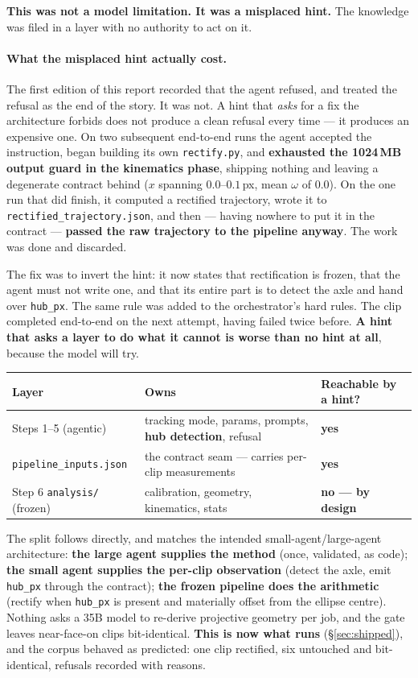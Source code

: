 \documentclass[11pt,a4paper]{article}
\begin{document}
\textbf{This was not a model limitation. It was a misplaced hint.} The knowledge was filed in a
layer with no authority to act on it.

\paragraph{What the misplaced hint actually cost.} The first edition of this report recorded that
the agent refused, and treated the refusal as the end of the story. It was not. A hint that
\emph{asks} for a fix the architecture forbids does not produce a clean refusal every time --- it
produces an expensive one. On two subsequent end-to-end runs the agent accepted the instruction,
began building its own \texttt{rectify.py}, and \textbf{exhausted the 1024\,MB output guard in the
kinematics phase}, shipping nothing and leaving a degenerate contract behind ($x$ spanning
$0.0$--$0.1$\,px, mean $\omega$ of $0.0$). On the one run that did finish, it computed a rectified
trajectory, wrote it to \texttt{rectified\_trajectory.json}, and then --- having nowhere to put it
in the contract --- \textbf{passed the raw trajectory to the pipeline anyway}. The work was done
and discarded.

The fix was to invert the hint: it now states that rectification is frozen, that the agent must not
write one, and that its entire part is to detect the axle and hand over \texttt{hub\_px}. The same
rule was added to the orchestrator's hard rules. The clip completed end-to-end on the next attempt,
having failed twice before. \textbf{A hint that asks a layer to do what it cannot is worse than no
hint at all}, because the model will try.

\begin{center}
\begin{tabular}{l p{6.6cm} l}
\toprule
Layer & Owns & Reachable by a hint? \\
\midrule
Steps 1--5 (agentic) & tracking mode, params, prompts, \textbf{hub detection}, refusal & \textbf{yes} \\
\texttt{pipeline\_inputs.json} & the contract seam --- carries per-clip measurements & \textbf{yes} \\
Step 6 \texttt{analysis/} (frozen) & calibration, geometry, kinematics, stats & \textbf{no --- by design} \\
\bottomrule
\end{tabular}
\end{center}

The split follows directly, and matches the intended small-agent/large-agent architecture:
\textbf{the large agent supplies the method} (once, validated, as code); \textbf{the small agent
supplies the per-clip observation} (detect the axle, emit \texttt{hub\_px} through the contract);
\textbf{the frozen pipeline does the arithmetic} (rectify when \texttt{hub\_px} is present and
materially offset from the ellipse centre). Nothing asks a 35B model to re-derive projective
geometry per job, and the gate leaves near-face-on clips bit-identical.
\textbf{This is now what runs} (\S\ref{sec:shipped}), and the corpus behaved as predicted: one
clip rectified, six untouched and bit-identical, refusals recorded with reasons.
\end{document}
